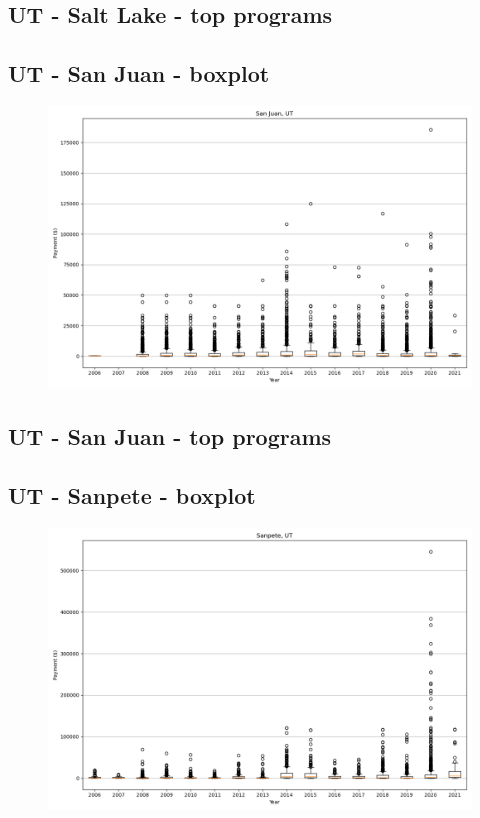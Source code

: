 \subsection*{UT - Salt Lake - top programs}

\newpage
\subsection*{UT - San Juan - boxplot}
\begin{figure}[h]
\centering
\includegraphics[width=7in]{../output/boxplots/counties/San Juan-UT_boxplot.png}
\end{figure}


\subsection*{UT - San Juan - top programs}

\newpage
\subsection*{UT - Sanpete - boxplot}
\begin{figure}[h]
\centering
\includegraphics[width=7in]{../output/boxplots/counties/Sanpete-UT_boxplot.png}
\end{figure}


